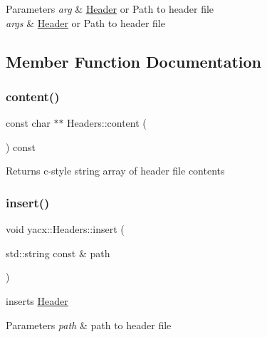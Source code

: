 \begin{DoxyParams}{Parameters}
{\em arg} & \hyperlink{classyacx_1_1_header}{Header} or Path to header file \\
\hline
{\em args} & \hyperlink{classyacx_1_1_header}{Header} or Path to header file \\
\hline
\end{DoxyParams}


\subsection{Member Function Documentation}
\mbox{\label{classyacx_1_1_headers_a80a31e958e7b1248bafdef6ce0c30c3c}} 
\subsubsection{\texorpdfstring{content()}{content()}}
{\footnotesize\ttfamily const char $\ast$$\ast$ Headers\+::content (\begin{DoxyParamCaption}{ }\end{DoxyParamCaption}) const}

\begin{DoxyReturn}{Returns}
c-\/style string array of header file contents 
\end{DoxyReturn}
\mbox{\label{classyacx_1_1_headers_a0428360b3ce224adc3a22bdbd486bfa0}} 
\subsubsection{\texorpdfstring{insert()}{insert()}\hspace{0.1cm}{\footnotesize\ttfamily [1/2]}}
{\footnotesize\ttfamily void yacx\+::\+Headers\+::insert (\begin{DoxyParamCaption}\item[{std\+::string const \&}]{path }\end{DoxyParamCaption})\hspace{0.3cm}{\ttfamily [inline]}}

inserts \hyperlink{classyacx_1_1_header}{Header} 
\begin{DoxyParams}{Parameters}
{\em path} & path to header file \\
\hline
\end{DoxyParams}
\mbox{\label{classyacx_1_1_headers_a43251bcac778655f4b539e4e8f56e672}} 
